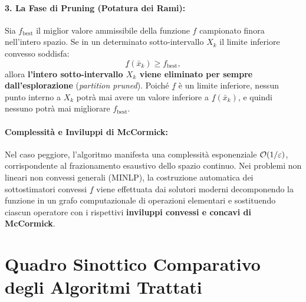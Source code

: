 \paragraph{3. La Fase di Pruning (Potatura dei Rami):}
Sia $f_{\text{best}}$ il miglior valore ammissibile della funzione $f$ campionato finora nell'intero spazio.
Se in un determinato sotto-intervallo $X_k$ il limite inferiore convesso soddisfa:
\begin{equation}
    \underline{f}(\bar{x}_k) \ge f_{\text{best}},
    \label{eq:pruning-condition-sbb}
\end{equation}
allora \textbf{l'intero sotto-intervallo $X_k$ viene eliminato per sempre dall'esplorazione} (\textit{partition pruned}). Poich\'e $\underline{f}$ \`e un limite inferiore, nessun punto interno a $X_k$ potr\`a mai avere un valore inferiore a $\underline{f}(\bar{x}_k)$, e quindi nessuno potr\`a mai migliorare $f_{\text{best}}$.

\paragraph{Complessit\`a e Inviluppi di McCormick:}
Nel caso peggiore, l'algoritmo manifesta una complessit\`a esponenziale $\mathcal{O}\!\left(1/\varepsilon\right)$, corrispondente al frazionamento esaustivo dello spazio continuo.
Nei problemi non lineari non convessi generali (MINLP), la costruzione automatica dei sottostimatori convessi $\underline{f}$ viene effettuata dai solutori moderni decomponendo la funzione in un grafo computazionale di operazioni elementari e sostituendo ciascun operatore con i rispettivi \textbf{inviluppi convessi e concavi di McCormick}.

\FloatBarrier
\section{Quadro Sinottico Comparativo degli Algoritmi Trattati}
\label{sec:univariata-quadro-sinottico}

